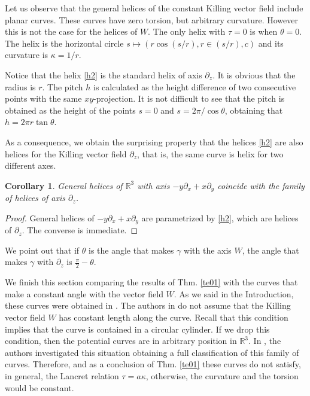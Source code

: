 \documentclass[a4paper,12pt]{amsart}
\newtheorem{corollary}[theorem]{Corollary}
\theoremstyle{definition}
\def\r{\mathbb R}
\begin{document}
Let us observe that   the general helices of the constant Killing vector field include planar curves. These curves have zero torsion, but arbitrary curvature. However this is not the case for the helices of $W$. The only helix with $\tau=0$ is when $\theta=0$. The helix is the horizontal circle $s\mapsto (r\cos(s/r),r\in(s/r),c)$ and its curvature is $\kappa=1/r$. 

Notice that the helix \eqref{h2} is the standard helix of axis $\partial_z$. It is obvious that the radius is $r$. The pitch $h$ is calculated as the height difference of two consecutive points with the same $xy$-projection. It is not difficult to see that the pitch is obtained as the height of the points $s=0$ and $s=2\pi /\cos\theta$, obtaining that $h=2\pi r \tan\theta$.


As a consequence, we obtain the surprising property that the helices \eqref{h2} are also helices for   the Killing vector field $\partial_z$, that is, the same curve is helix for two different axes.

\begin{corollary} General helices of $\r^3$ with axis $ -y\partial_x+x\partial_y$   coincide with the family of  helices of axis $\partial_z$. 
\end{corollary}

\begin{proof}   General helices of $ -y\partial_x+x\partial_y$   are parametrized by   \eqref{h2}, which are helices of $\partial_z$. The converse is immediate.  
\end{proof}

We point out  that if $\theta$ is the angle that makes $\gamma$ with the axis $W$, the angle that makes $\gamma$ with $\partial_z$ is $\frac{\pi}{2}-\theta$.  




 

We finish this section comparing the results of Thm. \ref{te01} with the curves that make a constant angle with the vector field $W$. As we said in the Introduction, these curves were obtained in \cite{mn}. The authors in \cite{mn} do not assume that the   Killing vector field $W$ has constant length along the curve. Recall that this condition implies that   the curve is contained in a circular cylinder. If we drop this condition, then the potential curves are in arbitrary position in $\r^3$. In \cite{mn}, the authors investigated this situation obtaining a full classification of this family of curves. Therefore, and as a conclusion of Thm. \ref{te01} these curves  do not satisfy, in general, the Lancret relation $\tau=a\kappa$, otherwise, the curvature and the torsion would be constant. 
\end{document}
